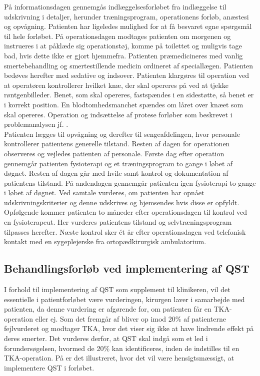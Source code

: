 På informationsdagen gennemgås indlæggelsesforløbet fra indlæggelse til udskrivning i detaljer, herunder træningsprogram,  operationens forløb, anæstesi og opvågning. Patienten har ligeledes mulighed for at få besvaret egne spørgsmål til hele forløbet. 
På operationsdagen modtages patienten om morgenen og instrueres i at påklæde sig operationstøj, komme på toilettet og muligvis tage bad, hvis dette ikke er gjort hjemmefra. Patienten præmedicineres med vanlig smertebehandling og smertestillende medicin ordineret af speciallægen. Patienten bedøves herefter med sedative og indsover. Patienten klargøres til operation ved at operatøren kontrollerer hvilket knæ, der skal opereres på ved at tjekke røntgenbilleder. Benet, som skal opereres, fastspændes i en sidestøtte, så benet er i korrekt position. En blodtomhedsmanchet spændes om låret over knæet som skal opereres. Operation og indsættelse af protese forløber som beskrevet i problemanalysen jf. . \citep{pritka2015} \\
Patienten lægges til opvågning og derefter til sengeafdelingen, hvor personale kontrollerer patientens generelle tilstand. Resten af dagen for operationen observeres og vejledes patienten af personale. Første dag efter operation gennemgår patienten fysioterapi og et træningsprogram to gange i løbet af døgnet. Resten af dagen går med hvile samt kontrol og dokumentation af patientens tilstand. På andendagen gennemgår patienten igen fysioterapi to gange i løbet af døgnet. Ved samtale vurderes, om patienten har opnået udskrivningskriterier og denne udskrives og hjemsendes hvis disse er opfyldt. \citep{pritka2015}
Opfølgende kommer patienten to måneder efter operationsdagen til kontrol ved en fysioterapeut. Her vurderes patientens tilstand og selvtræningsprogram tilpasses herefter. Næste kontrol sker ét år efter operationsdagen ved telefonisk kontakt med en sygeplejerske fra ortopædkirurgisk ambulatorium. \citep{pritka2015}




\subsection{Behandlingsforløb ved implementering af QST}
I forhold til implementering af QST som supplement til klinikeren, vil det essentielle i patientforløbet være vurderingen, kirurgen laver i samarbejde med patienten, da denne vurdering er afgørende for, om patienten får en TKA-operation eller ej. Som det fremgår af  bliver op imod 20\% af patienterne fejlvurderet og modtager TKA, hvor det viser sig ikke at have lindrende effekt på deres smerter. Det vurderes derfor, at QST skal indgå som et led i forundersøgelsen, hvormed de 20\% kan identificeres, inden de indstilles til en TKA-operation. På  er det illustreret, hvor det vil være hensigtsmæssigt, at implementere QST i forløbet. 

